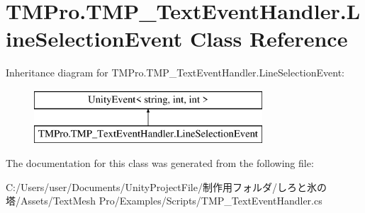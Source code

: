 \hypertarget{class_t_m_pro_1_1_t_m_p___text_event_handler_1_1_line_selection_event}{}\section{T\+M\+Pro.\+T\+M\+P\+\_\+\+Text\+Event\+Handler.\+Line\+Selection\+Event Class Reference}
\label{class_t_m_pro_1_1_t_m_p___text_event_handler_1_1_line_selection_event}
Inheritance diagram for T\+M\+Pro.\+T\+M\+P\+\_\+\+Text\+Event\+Handler.\+Line\+Selection\+Event\+:\begin{figure}[H]
\begin{center}
\leavevmode
\includegraphics[height=2.000000cm]{class_t_m_pro_1_1_t_m_p___text_event_handler_1_1_line_selection_event}
\end{center}
\end{figure}


The documentation for this class was generated from the following file\+:\begin{DoxyCompactItemize}
\item 
C\+:/\+Users/user/\+Documents/\+Unity\+Project\+File/制作用フォルダ/しろと氷の塔/\+Assets/\+Text\+Mesh Pro/\+Examples/\+Scripts/T\+M\+P\+\_\+\+Text\+Event\+Handler.\+cs\end{DoxyCompactItemize}
